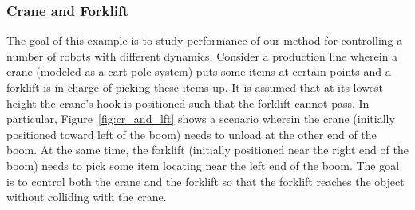 \subsubsection{Crane and Forklift}
\label{subsec}
The goal of this example is to study performance of our method for controlling a number of robots with different dynamics. Consider a production line wherein a crane (modeled as a cart-pole system) puts some items at certain points and a forklift is in charge of picking these items up. It is assumed that at its lowest height the crane's hook is positioned such that the forklift cannot pass. In particular, Figure~\ref{fig:cr_and_lft} shows a scenario wherein the crane (initially positioned toward left of the boom) needs to unload at the other end of the boom. At the same time, the forklift (initially positioned near the right end of the boom) needs to pick some item locating near the left end of the boom. The goal is to control both the crane and the forklift so that the forklift reaches the object without colliding with the crane. 


